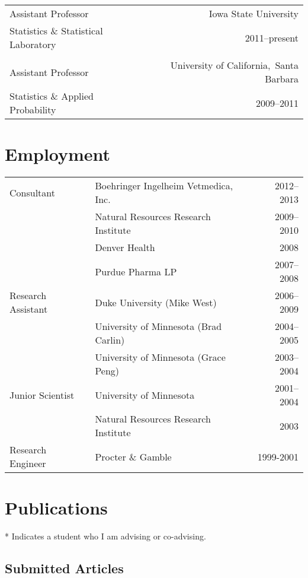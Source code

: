 \documentclass[overlapped,line]{res}
\begin{document}
\begin{resume}
\begin{tabular}{l@{\qquad}r}
Assistant Professor & Iowa State University \\
Statistics \& Statistical Laboratory & 2011--present \\
\\
Assistant Professor & University of California,\ Santa Barbara \\
Statistics \& Applied Probability & 2009--2011
\end{tabular}


\section{\bf Employment}

\begin{tabular}{l@{\qquad}l@{\qquad}r}
Consultant & Boehringer Ingelheim Vetmedica, Inc. & 2012--2013 \\
 & Natural Resources Research Institute  & 2009--2010 \\
 & Denver Health & 2008 \\
 & Purdue Pharma LP & 2007--2008 \\
Research Assistant & Duke University (Mike West) & 2006--2009 \\
 & University of Minnesota (Brad Carlin) & 2004--2005 \\
 & University of Minnesota (Grace Peng) & 2003--2004 \\
Junior Scientist & University of Minnesota & 2001--2004 \\
 & Natural Resources Research Institute & 2003 \\
Research Engineer & Procter \& Gamble & 1999-2001
\end{tabular}


\section{Publications}

* Indicates a student who I am advising or co-advising.

\vspace{-0.3in}

\subsection{\bf Submitted Articles}


\end{resume}
\end{document}
